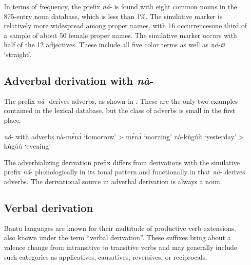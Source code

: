 In terms of frequency, the prefix {\itshape ná}- is found with eight common nouns in the 875-entry noun database, which is less than 1\%. The similative marker is relatively more widespread among proper names, with 16 occurrences{\textemdash}one third of a sample of about 50 female proper names. The similative marker occurs with half of the 12 adjectives. These include all five color terms as well as {\itshape ná-tĩ̂} `straight'. 





\subsection{Adverbal derivation with {\itshape nà}-}
\label{sec:ADVderiv}

The prefix {\itshape nà}-  derives adverbs, as shown in . These are the only two examples contained in the lexical database, but the class of adverbs is small in the first place. 

\ea \label{naSIM4}  {\itshape nà}- with adverbs
\ea  nà-mɛ́nɔ́ `tomorrow' > mɛ́nɔ́ `morning'
\ex nà-kùgúù `yesterday' > kùgúù `evening'
\z
\z

The adverbializing derivation prefix differs from derivations with the similative prefix {\itshape ná}- phonologically in its tonal pattern and functionally in that {\itshape nà}- derives adverbs. The derivational source in adverbal derivation is always a noun.



 













\subsection {Verbal derivation}
\label{sec:VDeriv}


Bantu languages are known for their multitude of productive verb extensions, also known under the term  ``verbal derivation''. These suffixes  bring about a valence change from intransitive to transitive verbs and may generally include such categories as applicatives, causatives, reversives, or reciprocals.

